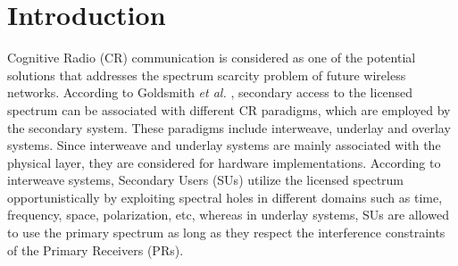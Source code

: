 \section{Introduction}%
Cognitive Radio (CR) communication is considered as one of the potential solutions that addresses the spectrum scarcity problem of future wireless networks. According to Goldsmith \textit{et al.} \cite{Goldsmith09}, secondary access to the licensed spectrum can be associated with different CR paradigms, which are employed by the secondary system. These paradigms include interweave, underlay and overlay systems. Since interweave and underlay systems are mainly associated with the physical layer, they are considered for hardware implementations. According to interweave systems, Secondary Users (SUs) utilize the licensed spectrum opportunistically by exploiting spectral holes in different domains such as time, frequency, space, polarization, etc, whereas in underlay systems, SUs are allowed to use the primary spectrum as long as they respect the interference constraints of the Primary Receivers (PRs). 

